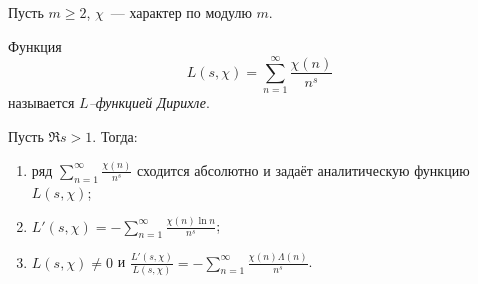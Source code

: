 Пусть $m \ge 2$, $\chi$ --- характер по модулю $m$.

\begin{ndefinition}
\label{II_L-function}
    Функция
    \[
        L(s, \chi) = \sum_{n=1}^\infty \frac{\chi(n)}{n^s}
    \]
    называется \emph{$L$--функцией Дирихле}.
\end{ndefinition}

\begin{nlemma}
\label{lm:II-4}
    Пусть $\Re{s} > 1$. Тогда:
    \begin{enumerate}
        \item
        \label{lm:II-4-1}
            ряд $\sum_{n=1}^\infty \frac{\chi(n)}{n^s}$ сходится абсолютно и задаёт аналитическую функцию $L(s, \chi)$;
        \item
        \label{lm:II-4-2}
            $L'(s, \chi) = -\sum_{n=1}^\infty \frac{\chi(n)\ln{n}}{n^s}$;
        \item
        \label{lm:II-4-3}
            $L(s, \chi) \ne 0$ и $\frac{L'(s, \chi)}{L(s, \chi)} = -\sum_{n=1}^\infty \frac{\chi(n)\Lambda(n)}{n^s}$.
    \end{enumerate}
\end{nlemma}
